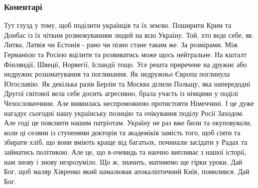  
 
 
 
 
\subsubsection{Коментарі}
\label{sec:10_08_2021.fb.karpij_vladimir.1.maguchih_farion_olimpiada.cmt}

\begin{itemize}
 

Тут глузд у тому, щоб поділити українців та їх землю. Поширити Крим та Донбас
із їх чітким розмежуванням людей на всю Україну. Той, хто веде себе, як Литва,
Латвія чи Естонія - рано чи пізно стане таким же. За розмірами. Між Германією
та Росією вцілити та розвиватись може щось нейтральне. На кшталт Фінляндії,
Швеції, Норвегії, Ісландії тощо. Усе решта приречене на дружнє або недружнє
розшматування та поглинання. Як недружньо Європа поглинула Югославію. Як
декілька разів Берлін та Москва ділили Польщу, яка напередодні Другої світової
вела себе досить агресивно, брала участь із німцями у поділі Чехословаччини.
Але виявилась неспроможною протистояти Німеччині. І це дуже нагадує сьогодні
нашу українську позицію та очікування поділу Росії Заходом. Але годі це
пояснити нашим патріотам. Україну не раз вже били та окуповували, коли ці
селяни із ступенями докторів та академіків замість того, щоб сіяти та збирати
хліб, що вони вміють краще від багатьох, починали засідати у Радах та займатись
політикою. Але це, що в-очевидь та наочно випливає з нашої історії, нам знову і
знову незрозуміло. Що ж, значить, матимемо ще гірки уроки. Дай Бог, щоб маляр
Хівренко який намалював апокаліптичний Київ, помилився. Дай Бог.




\end{itemize}
